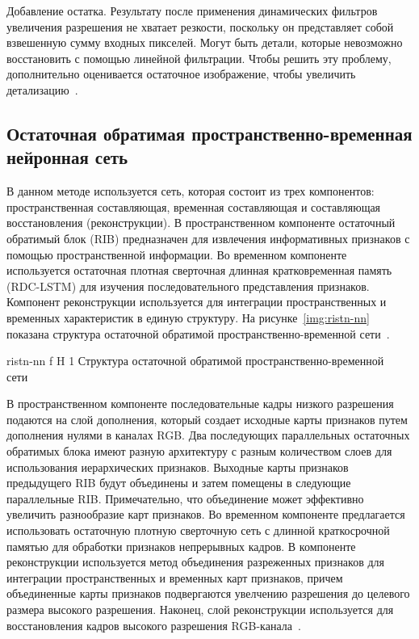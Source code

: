 \documentclass{bmstu}
\begin{document}
Добавление остатка. 
Результату после применения динамических фильтров увеличения разрешения не хватает резкости, поскольку он представляет собой взвешенную сумму входных пикселей. 
Могут быть детали, которые невозможно восстановить с помощью линейной фильтрации. 
Чтобы решить эту проблему, дополнительно оценивается остаточное изображение, чтобы увеличить детализацию~\cite{Younghyun2018}.

\subsection{Остаточная обратимая пространственно-временная нейронная сеть}

В данном методе используется сеть, которая состоит из трех компонентов: пространственная составляющая, временная составляющая и составляющая восстановления (реконструкции). 
В пространственном компоненте остаточный обратимый блок (RIB) предназначен для извлечения информативных признаков с помощью пространственной информации. 
Во временном компоненте используется остаточная плотная сверточная длинная кратковременная память (RDC-LSTM) для изучения последовательного представления признаков. 
Компонент реконструкции используется для интеграции пространственных и временных характеристик в единую структуру. 
На рисунке~\ref{img:ristn-nn} показана структура остаточной обратимой пространственно-временной сети~\cite{Xiaobin2019}.

    {ristn-nn}
    {f}
    {H}
    {1\textwidth}
    {Структура остаточной обратимой пространственно-временной сети~\cite{Xiaobin2019}}
    
В пространственном компоненте последовательные кадры низкого разрешения подаются на слой дополнения, который создает исходные карты признаков путем дополнения нулями в каналах RGB. 
Два последующих параллельных остаточных обратимых блока имеют разную архитектуру с разным количеством слоев для использования иерархических признаков. 
Выходные карты признаков предыдущего RIB будут объединены и затем помещены в следующие параллельные RIB. 
Примечательно, что объединение может эффективно увеличить разнообразие карт признаков. 
Во временном компоненте предлагается использовать остаточную плотную сверточную сеть с длинной краткосрочной памятью для обработки признаков непрерывных кадров. 
В компоненте реконструкции используется метод объединения разреженных признаков для интеграции пространственных и временных карт признаков, причем объединенные карты признаков подвергаются увелчению разрешения до целевого размера высокого разрешения. 
Наконец, слой реконструкции используется для восстановления кадров высокого разрешения RGB-канала~\cite{Xiaobin2019}.
\end{document}
